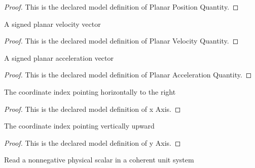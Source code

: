 \begin{proof}
  This is the declared model definition of Planar Position Quantity.
\end{proof}
\begin{definition}
  \label{def:physics:phyx-mini-0745:phyxminiproblems-problemphyxmini0745-planarvelocityquantity}
  A signed planar velocity vector
\end{definition}
\begin{proof}
  This is the declared model definition of Planar Velocity Quantity.
\end{proof}
\begin{definition}
  \label{def:physics:phyx-mini-0745:phyxminiproblems-problemphyxmini0745-planaraccelerationquantity}
  A signed planar acceleration vector
\end{definition}
\begin{proof}
  This is the declared model definition of Planar Acceleration Quantity.
\end{proof}
\begin{definition}[x Axis]
  \label{def:physics:phyx-mini-0745:phyxminiproblems-problemphyxmini0745-xaxis}
  The coordinate index pointing horizontally to the right
\end{definition}
\begin{proof}
  This is the declared model definition of x Axis.
\end{proof}
\begin{definition}[y Axis]
  \label{def:physics:phyx-mini-0745:phyxminiproblems-problemphyxmini0745-yaxis}
  The coordinate index pointing vertically upward
\end{definition}
\begin{proof}
  This is the declared model definition of y Axis.
\end{proof}
\begin{definition}
  \label{def:physics:phyx-mini-0745:phyxminiproblems-problemphyxmini0745-nonnegativereadout}
  Read a nonnegative physical scalar in a coherent unit system
\end{definition}
